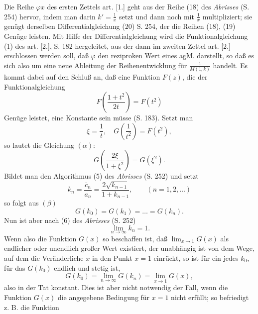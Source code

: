 \begingroup
\makeatletter\tagsleft@true\let\veqno\@@leqno\makeatother
{}
\begin{center}\end{center}
\par\indent Die Reihe $\varphi x$ des ersten Zettels art. [1.] geht aus der Reihe (18) des \textit{Abrisses} (S. 254) hervor, indem man darin $k'=\frac1x$ setzt und dann noch mit $\frac1x$ multipliziert; sie genügt derselben Differentialgleichung (20) S. 254, der die Reihen (18), (19) Genüge leisten. Mit Hilfe der Differentialgleichung wird die Funktionalgleichung (1) des art. [2.], S. 182 hergeleitet, aus der dann im zweiten Zettel art. [2.] erschlossen werden soll, daß $\varphi$ den reziproken Wert eines agM. darstellt, so daß es sich also um eine neue Ableitung der Reihenentwicklung für $\frac1{M(1,k)}$ handelt. Es kommt dabei auf den Schluß an, daß eine Funktion $F(z)$, die der Funktionalgleichung
\begin{equation*}\tag*{$(\alpha)$}F\left(\frac{1+t^2}{2t}\right)=F(t^2)\end{equation*}
\noindent Genüge leistet, eine Konstante sein müsse (S. 183). Setzt man
\[\xi=\frac1t,\quad G\left(\frac1{t^2}\right)=F(t^2),\]
\noindent so lautet die Gleichung $(\alpha)$:
\clearpage
\fancyhead{}
\begin{equation*}\tag*{$(\beta)$}G\left(\frac{2\xi}{1+\xi^2}\right)=G(\xi^2).\end{equation*}
\noindent Bildet man den Algorithmus (5) des \textit{Abrisses} (S. 252) und setzt
\[k_n=\frac{\bar c_n}{a_n}=\frac{2\sqrt{k_{n-1}}}{1+k_{n-1}},\qquad(n=1,2,\ldots)\]
\noindent so folgt aus $(\beta)$
\[G(k_0)=G(k_1)=\ldots=G(k_n).\]
\noindent Nun ist aber nach (6) des \textit{Abrisses} (S. 252)
\[\lim_{n\to\infty}k_n=1.\]
\noindent Wenn also die Funktion $G(x)$ so beschaffen ist, daß $\displaystyle\lim_{x\to1}G(x)$ als endlicher oder unendlich großer Wert existiert, der unabhängig ist von dem Wege, auf dem die Veränderliche $x$ in den Punkt $x=1$ einrückt, so ist für ein jedes $k_0$, für das $G(k_0)$ endlich und stetig ist,
\[G(k_0)=\lim_{n\to\infty}G(k_n)=\lim_{x\to1}G(x),\]
\noindent also in der Tat konstant. Dies ist aber nicht notwendig der Fall, wenn die Funktion $G(x)$ die angegebene Bedingung für $x=1$ nicht erfüllt; so befriedigt z. B. die Funktion
